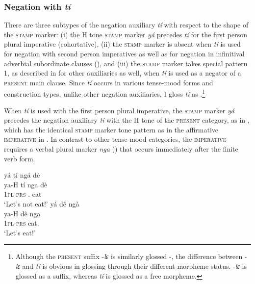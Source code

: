 \subsubsection{Negation with {\itshape tí}}
\label{sec:NEGti}






There are three subtypes of the negation auxiliary {\itshape tí} with respect to the shape of the \textsc{stamp} marker:
(i) the H tone \textsc{stamp} marker {\itshape yá} precedes {\itshape tí}  for the first person plural imperative (cohortative), (ii) the \textsc{stamp} marker is absent when {\itshape tí} is used for negation with second person imperatives as well as for negation in infinitival adverbial subordinate clauses (), and (iii) the \textsc{stamp} marker takes special pattern 1, as described in  for other auxiliaries as well, when {\itshape tí} is used as a negator of a \textsc{present} main clause. Since {\itshape tí} occurs in various tense-mood forms and construction types, unlike other negation auxiliaries, I gloss {\itshape tí} as {\NEG}.\footnote{Although the \textsc{present} suffix -{\itshape lɛ} is similarly glossed -{\NEG}, the difference between -{\itshape lɛ} and {\itshape tí} is obvious in glossing through their different morpheme status. -{\itshape lɛ} is glossed as a suffix, whereas {\itshape tí} is glossed as a free morpheme.}




When {\itshape tí} is used with the first person plural imperative, the \textsc{stamp} marker {\itshape yá} precedes the negation auxiliary {\itshape tí} with the H tone of the \textsc{present} category, as in , which has the identical \textsc{stamp} marker tone pattern as in the affirmative \textsc{imperative} in . In contrast to other tense-mood categories, the \textsc{imperative} requires a verbal plural marker {\itshape nga} () that occurs immediately after the finite verb form.
 
\ea\label{ti1}
\ea \label{ti1a}
  \glll  yá tí ngá dè \\
        ya-H tí nga dè \\
           1\textsc{pl}-\textsc{prs} {\NEG}.{\R} {\PL}  eat\\
    \trans `Let's not eat!'
\ex\label{ti1b}
  \glll  yá dê ngà \\
        ya-H dê nga\\
        1\textsc{pl}-\textsc{prs} eat.{\IMP} {\PL}     \\
    \trans `Let's eat!'
\z
\z

